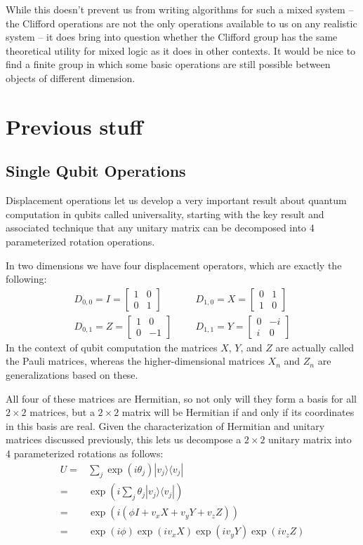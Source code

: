 \documentclass[]{article}
\newcommand{\bra}[1]{\langle #1 |}
\newcommand{\ket}[1]{| #1 \rangle}
\begin{document}
While this doesn't prevent us from writing algorithms for such a mixed system -- the Clifford operations are not the only operations available to us on any realistic system -- it does bring into question whether the Clifford group has the same theoretical utility for mixed logic as it does in other contexts. It would be nice to find a finite group in which some basic operations are still possible between objects of different dimension.


\section{Previous stuff}
\subsection{Single Qubit Operations}

Displacement operations let us develop a very important result about quantum computation in qubits called universality, starting with the key result and associated technique that any unitary matrix can be decomposed into 4 parameterized rotation operations.

In two dimensions we have four displacement operators, which are exactly the following:
\begin{align*}
D_{0,0}=I=\left[\begin{matrix}
1&0\\
0&1
\end{matrix}\right]
&&&
D_{1,0}=X=\left[\begin{matrix}
0&1\\
1&0
\end{matrix}\right]
\\
D_{0,1}=Z=\left[\begin{matrix}
1&0\\
0&-1
\end{matrix}\right]
&&&
D_{1,1}=Y=\left[\begin{matrix}
0&-i\\
i&0
\end{matrix}\right]
\end{align*}
In the context of qubit computation the matrices $X$, $Y$, and $Z$ are actually called the Pauli matrices, whereas the higher-dimensional matrices $X_n$ and $Z_n$ are generalizations based on these.

All four of these matrices are Hermitian, so not only will they form a basis for all $2\times2$ matrices, but a $2\times2$ matrix will be Hermitian if and only if its coordinates in this basis are real. Given the characterization of Hermitian and unitary matrices discussed previously, this lets us decompose a $2\times2$ unitary matrix into 4 parameterized rotations as follows:
\begin{align*}
U
=& \sum_j \exp(i\theta_j)\ket{v_j}\bra{v_j}
\\=& \exp\left(i\sum_j \theta_j\ket{v_j}\bra{v_j}\right)
\\=& \exp\left(i(\phi I + v_xX+v_yY+v_zZ)\right)
\\=& \exp\left(i\phi\right)\exp(iv_xX)\exp(iv_yY)\exp(iv_zZ)
\end{align*}
\end{document}
